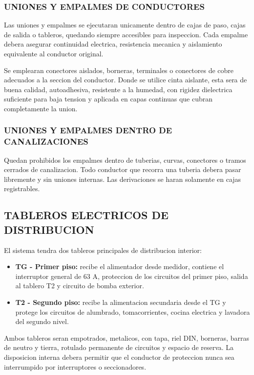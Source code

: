 \subsubsection{UNIONES Y EMPALMES DE CONDUCTORES}

Las uniones y empalmes se ejecutaran unicamente dentro de cajas de paso, cajas de salida o tableros, quedando siempre accesibles para inspeccion. Cada empalme debera asegurar continuidad electrica, resistencia mecanica y aislamiento equivalente al conductor original.

Se emplearan conectores aislados, borneras, terminales o conectores de cobre adecuados a la seccion del conductor. Donde se utilice cinta aislante, esta sera de buena calidad, autoadhesiva, resistente a la humedad, con rigidez dielectrica suficiente para baja tension y aplicada en capas continuas que cubran completamente la union.

\subsubsection{UNIONES Y EMPALMES DENTRO DE CANALIZACIONES}

Quedan prohibidos los empalmes dentro de tuberias, curvas, conectores o tramos cerrados de canalizacion. Todo conductor que recorra una tuberia debera pasar libremente y sin uniones internas. Las derivaciones se haran solamente en cajas registrables.

\subsection{TABLEROS ELECTRICOS DE DISTRIBUCION}

El sistema tendra dos tableros principales de distribucion interior:

\begin{itemize}
  \item \textbf{TG - Primer piso:} recibe el alimentador desde medidor, contiene el interruptor general de 63 A, proteccion de los circuitos del primer piso, salida al tablero T2 y circuito de bomba exterior.
  \item \textbf{T2 - Segundo piso:} recibe la alimentacion secundaria desde el TG y protege los circuitos de alumbrado, tomacorrientes, cocina electrica y lavadora del segundo nivel.
\end{itemize}

Ambos tableros seran empotrados, metalicos, con tapa, riel DIN, borneras, barras de neutro y tierra, rotulado permanente de circuitos y espacio de reserva. La disposicion interna debera permitir que el conductor de proteccion nunca sea interrumpido por interruptores o seccionadores.

